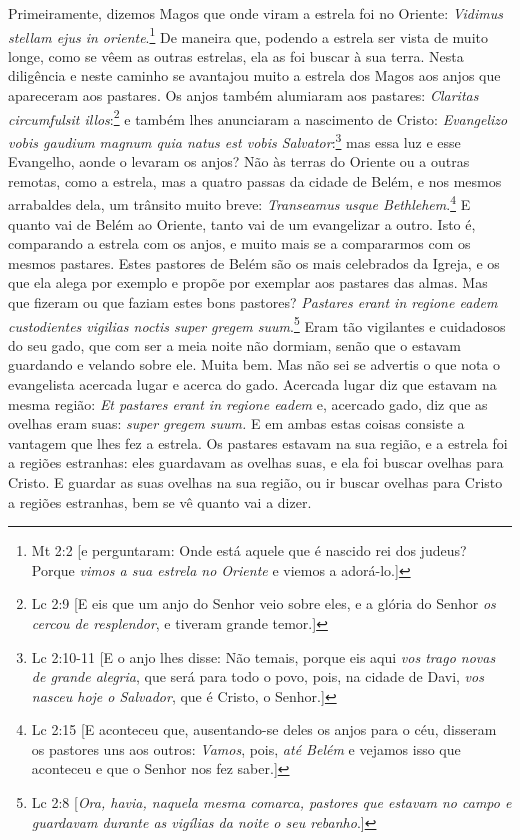 Primeiramente, dizemos Magos que onde viram a estrela foi no Oriente:
\emph{Vidimus stellam ejus in oriente}.\footnote{Mt 2:2 [e perguntaram: Onde está aquele que é nascido rei dos judeus? Porque \emph{vimos a sua estrela no Oriente} e viemos a adorá-lo.]} De maneira que, podendo a estrela ser vista de muito longe, como se vêem as outras
estrelas, ela as foi buscar à sua terra. Nesta diligência e neste
caminho se avantajou muito a estrela dos Magos aos anjos que apareceram
aos pastares. Os anjos também alumiaram aos pastares: \emph{Claritas
circumfulsit illos}:\footnote{Lc 2:9 [E eis que um anjo do Senhor veio sobre eles, e a glória do Senhor \emph{os cercou de resplendor},
e tiveram grande temor.]} e também lhes anunciaram a nascimento de
Cristo: \emph{Evangelizo vobis gaudium magnum quia natus est vobis Salvator}:\footnote{Lc 2:10-11 [E o anjo lhes disse: Não temais, porque eis aqui \emph{vos trago novas de grande alegria}, que será para todo o povo, pois, na cidade de Davi, \emph{vos nasceu hoje o Salvador}, que é Cristo, o Senhor.]} mas essa luz e esse
Evangelho, aonde o levaram os anjos? Não às terras do Oriente ou a
outras remotas, como a estrela, mas a quatro passas da cidade de Belém,
e nos mesmos arrabaldes dela, um trânsito muito breve: \emph{Transeamus
usque Bethlehem}.\footnote{Lc 2:15 [E aconteceu que, ausentando-se deles os anjos para o céu, disseram os pastores uns aos outros: \emph{Vamos}, pois, \emph{até Belém} e vejamos isso que aconteceu e que o Senhor nos fez saber.]} E quanto vai de Belém ao Oriente, tanto
vai de um evangelizar a outro. Isto é, comparando a estrela com os
anjos, e muito mais se a compararmos com os mesmos pastares. Estes
pastores de Belém são os mais celebrados da Igreja, e os que ela alega
por exemplo e propõe por exemplar aos pastares das almas. Mas que
fizeram ou que faziam estes bons pastores? \emph{Pastares erant in
regione eadem custodientes vigilias noctis super gregem suum}.\footnote{Lc 2:8 [\emph{Ora, havia, naquela mesma comarca, pastores que estavam no campo e guardavam durante
as vigílias da noite o seu rebanho}.]}
Eram tão vigilantes e cuidadosos do seu gado, que com ser a
meia noite não dormiam, senão que o estavam guardando e velando sobre
ele. Muita bem. Mas não sei se advertis o que nota o evangelista
acercada lugar e acerca do gado. Acercada lugar diz que estavam na mesma
região: \emph{Et pastares erant in regione eadem} e, acercado gado, diz
que as ovelhas eram suas: \emph{super gregem suum.} E em ambas estas
coisas consiste a vantagem que lhes fez a estrela. Os pastares estavam
na sua região, e a estrela foi a regiões estranhas: eles guardavam as
ovelhas suas, e ela foi buscar ovelhas para Cristo. E guardar as suas
ovelhas na sua região, ou ir buscar ovelhas para Cristo a regiões
estranhas, bem se vê quanto vai a dizer.

